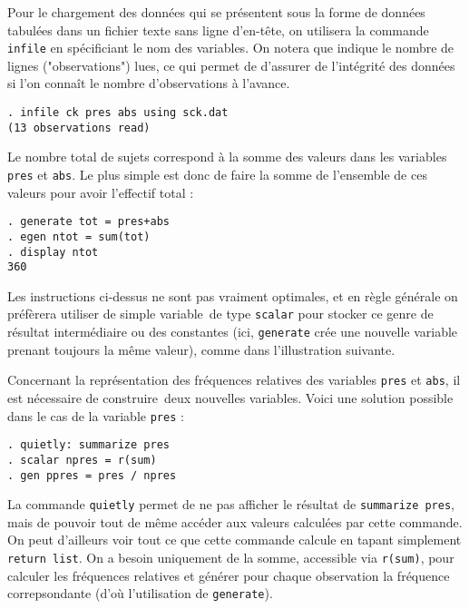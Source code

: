 %
%
%
\soln{\ref{exo:10.5}}
Pour le chargement des données qui se présentent sous la forme de données
tabulées dans un fichier texte sans ligne d'en-tête, on utilisera la
commande \texttt{infile} en spécificiant le nom des variables. On notera que
\Stata indique le nombre de lignes ("observations") lues, ce qui permet de
d'assurer de l'intégrité des données si l'on connaît le nombre
d'observations à l'avance.
\begin{verbatim}
. infile ck pres abs using sck.dat
(13 observations read)
\end{verbatim}

Le nombre total de sujets correspond à la somme des valeurs dans les
variables \texttt{pres} et \texttt{abs}. Le plus simple est donc de faire la
somme de l'ensemble de ces valeurs pour avoir l'effectif total :
\begin{verbatim}
. generate tot = pres+abs
. egen ntot = sum(tot)
. display ntot
360
\end{verbatim}
Les instructions ci-dessus ne sont pas vraiment optimales, et en règle
générale on préfèrera utiliser de simple \og variable\fg\ de type
\verb|scalar| pour stocker ce genre de résultat intermédiaire ou des
constantes (ici, \verb|generate| crée une nouvelle variable prenant toujours
la même valeur), comme dans l'illustration suivante.

Concernant la représentation des fréquences relatives des variables
\texttt{pres} et \texttt{abs}, il est nécessaire de \og construire\fg\ deux
nouvelles variables. Voici une solution possible dans le cas de la variable
\texttt{pres} :
\begin{verbatim}
. quietly: summarize pres
. scalar npres = r(sum)
. gen ppres = pres / npres
\end{verbatim}
La commande \verb|quietly| permet de ne pas afficher le résultat de
\verb|summarize pres|, mais de pouvoir tout de même accéder aux valeurs
calculées par cette commande. On peut d'ailleurs voir tout ce que cette
commande calcule en tapant simplement \verb|return list|. On a besoin
uniquement de la somme, accessible via \verb|r(sum)|, pour calculer les
fréquences relatives et générer pour chaque observation la fréquence
correpsondante (d'où l'utilisation de \verb|generate|).

